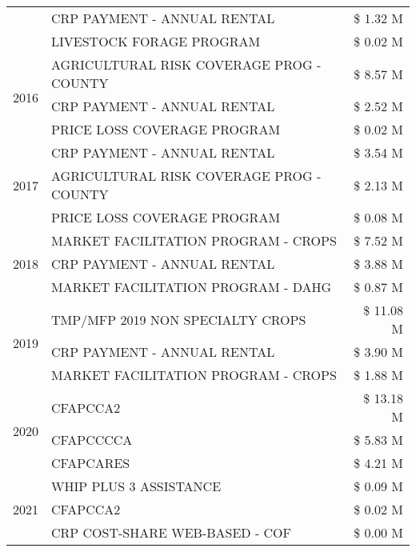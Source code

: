 \begin{tabular}{llr}
 & CRP PAYMENT - ANNUAL RENTAL & \$ 1.32 M \\
 & LIVESTOCK FORAGE PROGRAM & \$ 0.02 M \\
\cline{1-3}
\multirow[t]{3}{*}{2016} & AGRICULTURAL RISK COVERAGE PROG - COUNTY & \$ 8.57 M \\
 & CRP PAYMENT - ANNUAL RENTAL & \$ 2.52 M \\
 & PRICE LOSS COVERAGE PROGRAM & \$ 0.02 M \\
\cline{1-3}
\multirow[t]{3}{*}{2017} & CRP PAYMENT - ANNUAL RENTAL & \$ 3.54 M \\
 & AGRICULTURAL RISK COVERAGE PROG - COUNTY & \$ 2.13 M \\
 & PRICE LOSS COVERAGE PROGRAM & \$ 0.08 M \\
\cline{1-3}
\multirow[t]{3}{*}{2018} & MARKET FACILITATION PROGRAM - CROPS & \$ 7.52 M \\
 & CRP PAYMENT - ANNUAL RENTAL & \$ 3.88 M \\
 & MARKET FACILITATION PROGRAM - DAHG & \$ 0.87 M \\
\cline{1-3}
\multirow[t]{3}{*}{2019} & TMP/MFP 2019 NON SPECIALTY CROPS & \$ 11.08 M \\
 & CRP PAYMENT - ANNUAL RENTAL & \$ 3.90 M \\
 & MARKET FACILITATION PROGRAM - CROPS & \$ 1.88 M \\
\cline{1-3}
\multirow[t]{3}{*}{2020} & CFAPCCA2 & \$ 13.18 M \\
 & CFAPCCCCA & \$ 5.83 M \\
 & CFAPCARES & \$ 4.21 M \\
\cline{1-3}
\multirow[t]{3}{*}{2021} & WHIP PLUS 3 ASSISTANCE & \$ 0.09 M \\
 & CFAPCCA2 & \$ 0.02 M \\
 & CRP COST-SHARE WEB-BASED - COF & \$ 0.00 M \\
\cline{1-3}
\bottomrule
\end{tabular}
